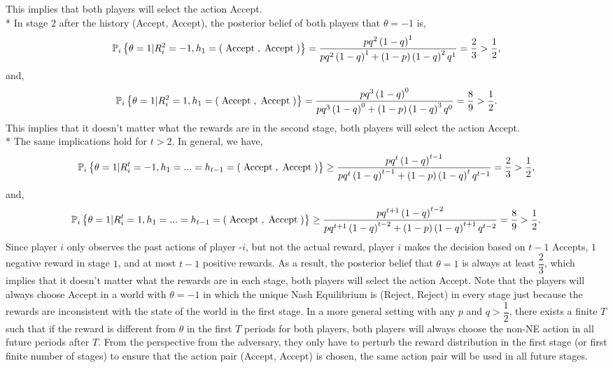 \documentclass{article}
\begin{document}
This implies that both players will select the action Accept.
\\* In stage $2$ after the history {(Accept, Accept)}, the posterior belief of both players that $\theta = -1$ is,
\begin{equation} 
\mathbb{P}_{i} \left\{\theta = 1 | R_{i}^{2} = -1, h_{1} = \left(\text{\;Accept\;}, \text{\;Accept\;}\right)\right\} = \dfrac{p q^{2} \left(1 - q\right)^{1}}{p q^{2} \left(1 - q\right)^{1} + \left(1 - p\right)\left(1 - q\right)^{2} q^{1}} = \dfrac{2}{3} > \dfrac{1}{2} ,
\end{equation}
and,
\begin{equation} 
\mathbb{P}_{i} \left\{\theta = 1 | R_{i}^{2} = 1, h_{1} = \left(\text{\;Accept\;}, \text{\;Accept\;}\right)\right\} = \dfrac{p q^{3} \left(1 - q\right)^{0}}{p q^{3} \left(1 - q\right)^{0} + \left(1 - p\right)\left(1 - q\right)^{3} q^{0}} = \dfrac{8}{9} > \dfrac{1}{2} .
\end{equation}
This implies that it doesn't matter what the rewards are in the second stage, both players will select the action Accept.
\\* The same implications hold for $t  > 2$. In general, we have,
\begin{equation} 
\mathbb{P}_{i} \left\{\theta = 1 | R_{i}^{t} = -1, h_{1} = ... = h_{t-1} = \left(\text{\;Accept\;}, \text{\;Accept\;}\right)\right\} \geq  \dfrac{p q^{t} \left(1 - q\right)^{t-1}}{p q^{t} \left(1 - q\right)^{t-1} + \left(1 - p\right)\left(1 - q\right)^{t} q^{t-1}} = \dfrac{2}{3} > \dfrac{1}{2} ,
\end{equation}
and,
\begin{equation} 
\mathbb{P}_{i} \left\{\theta = 1 | R_{i}^{t} = 1, h_{1} = ... = h_{t-1} = \left(\text{\;Accept\;}, \text{\;Accept\;}\right)\right\} \geq  \dfrac{p q^{t+1} \left(1 - q\right)^{t-2}}{p q^{t+1} \left(1 - q\right)^{t-2} + \left(1 - p\right)\left(1 - q\right)^{t+1} q^{t-2}} = \dfrac{8}{9} > \dfrac{1}{2} .
\end{equation}
Since player $i $ only observes the past actions of player -$i $, but not the actual reward, player $i $ makes the decision based on $t  - 1$ Accepts, $1$ negative reward in stage $1$, and at most $t  - 1$ positive rewards. As a result, the posterior belief that $\theta = 1$ is always at least $\dfrac{2}{3}$, which implies that it doesn't matter what the rewards are in each stage, both players will select the action Accept.
\newline \newline
Note that the players will always choose Accept in a world with $\theta = -1$ in which the unique Nash Equilibrium is (Reject, Reject) in every stage just because the rewards are inconsistent with the state of the world in the first stage. In a more general setting with any $p $ and $q  > \dfrac{1}{2}$, there exists a finite $T $ such that if the reward is different from $\theta$ in the first $T $ periods for both players, both players will always choose the non-NE action in all future periods after $T. $
\newline \newline
From the perspective from the adversary, they only have to perturb the reward distribution in the first stage (or first finite number of stages) to ensure that the action pair (Accept, Accept) is chosen, the same action pair will be used in all future stages.
\newline \newline
\end{document}

